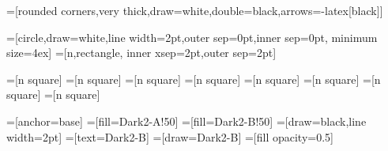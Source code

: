 \usepackage{xcolor}

\usepackage{tikz}
\usetikzlibrary{quotes}
\usetikzlibrary{shapes.misc}
\usetikzlibrary{shadows,shadows.blur}



=[rounded corners,very thick,draw=white,double=black,arrows={-latex[black]}]

=[circle,draw=white,line width=2pt,outer sep=0pt,inner sep=0pt, minimum size=4ex]
=[n,rectangle, inner xsep=2pt,outer sep=2pt]

=[n square]
=[n square]
=[n square]
=[n square]
=[n square]
=[n square]
=[n square]
=[n square]

=[anchor=base]
=[fill=Dark2-A!50]
=[fill=Dark2-B!50]
=[draw=black,line width=2pt]
=[text=Dark2-B]
=[draw=Dark2-B]
=[fill opacity=0.5]

\newcommand\innode[ 2 ]{ 
  \begin{tikzpicture}[baseline] 
      \node[inline,inner ysep=0pt,inner xsep=3pt,outer sep=0pt,opacity=0] (n) {#1}; 
      \useasboundingbox (n.north west) rectangle (n.south east);
      \node[n,minimum size=3ex,inner sep=1pt,inline,#2] {#1}; 
  \end{tikzpicture}
  }

\makeatletter
\DeclareRobustCommand{\rvdots}{%
  \vbox{
    \baselineskip4\p@\lineskiplimit\z@
    \kern-\p@
    \hbox{.}\hbox{.}\hbox{.}
  }}
\makeatother